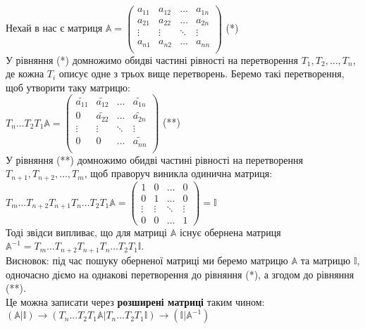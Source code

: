 \documentclass[a4paper, 10pt]{article}
\theoremstyle{theoremdd}
\theoremstyle{theoremdd}
\theoremstyle{theoremdd}
\theoremstyle{theoremdd}
\theoremstyle{theoremdd}
\theoremstyle{theoremdd}
\theoremstyle{theoremdd}
\theoremstyle{theoremdd}
\begin{document}
Нехай в нас є матриця $\mathbb{A} = \begin{pmatrix}
a_{11} & a_{12} & \dots & a_{1n} \\
a_{21} & a_{22} & \dots & a_{2n} \\
\vdots & \vdots & \ddots & \vdots \\
a_{n1} & a_{n2} & \dots & a_{nn} \\
\end{pmatrix}$ (*) \\
У рівняння (*) домножимо обидві частині рівності на перетворення $T_1,T_2, \dots, T_n$, де кожна $T_i$ описує одне з трьох вище перетворень. Беремо такі перетворення, щоб утворити таку матрицю:\\
$T_n \dots T_2 T_1 \mathbb{A} = \begin{pmatrix}
\tilde{a_{11}} & \tilde{a_{12}} & \dots & \tilde{a_{1n}} \\
0 & \tilde{a_{22}} & \dots & \tilde{a_{2n}} \\
\vdots & \vdots & \ddots & \vdots \\
0 & 0 & \dots & \tilde{a_{nn}} \\
\end{pmatrix}$ (**) \\
У рівняння (**) домножимо обидві частині рівності на перетворення $T_{n+1}, T_{n+2},\dots, T_m$, щоб праворуч виникла одинична матриця:\\
$T_m \dots T_{n+2} T_{n+1} T_n \dots T_2 T_1 \mathbb{A} = \begin{pmatrix}
1 & 0 & \dots & 0 \\
0 & 1 & \dots & 0 \\
\vdots & \vdots & \ddots & \vdots \\
0 & 0 & \dots & 1
\end{pmatrix} = \mathbb{I}$\\
Тоді звідси випливає, що для матриці $\mathbb{A}$ існує обернена матриця $\mathbb{A}^{-1} = T_m \dots T_{n+2} T_{n+1} T_n \dots T_2 T_1 \mathbb{I}$.
\bigskip \\
Висновок: під час пошуку оберненої матриці ми беремо матрицю $\mathbb{A}$ та матрицю $\mathbb{I}$, одночасно діємо на однакові перетворення до рівняння (*), а згодом до рівняння (**).\\
Це можна записати через \textbf{розширені матриці} таким чином:\\
$(\mathbb{A} | \mathbb{I}) \longrightarrow (T_n \dots T_2 T_1 \mathbb{A} | T_n \dots T_2 T_1 \mathbb{I} ) \longrightarrow (\mathbb{I} | \mathbb{A}^{-1})$
\end{document}
